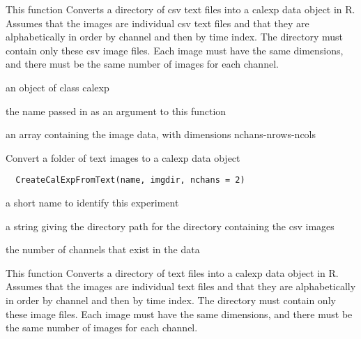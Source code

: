 \documentclass[a4paper]{book}
\begin{document}
%
\begin{Details}\relax
This function Converts a directory of csv text files into
a calexp data object in R. Assumes that the images are
individual csv text files and that they are
alphabetically in order by channel and then by time
index.  The directory must contain only these csv image
files. Each image must have the same dimensions, and
there must be the same number of images for each channel.
\end{Details}
%
\begin{Value}
an object of class calexp \begin{ldescription}
\item[\code{name}] the name passed in
as an argument to this function\item[\code{data}] an array
containing the image data, with dimensions
nchans-nrows-ncols
\end{ldescription}
\end{Value}
%
\begin{Description}\relax
Convert a folder of text images to a calexp data object
\end{Description}
%
\begin{Usage}
\begin{verbatim}
  CreateCalExpFromText(name, imgdir, nchans = 2)
\end{verbatim}
\end{Usage}
%
\begin{Arguments}
\begin{ldescription}
\item[\code{name}] a short name to identify this experiment

\item[\code{imgdir}] a string giving the directory path for the
directory containing the csv images

\item[\code{nchans}] the number of channels that exist in the
data
\end{ldescription}
\end{Arguments}
%
\begin{Details}\relax
This function Converts a directory of text files into a
calexp data object in R. Assumes that the images are
individual text files and that they are alphabetically in
order by channel and then by time index.  The directory
must contain only these image files. Each image must have
the same dimensions, and there must be the same number of
images for each channel.
\end{Details}
\end{document}
